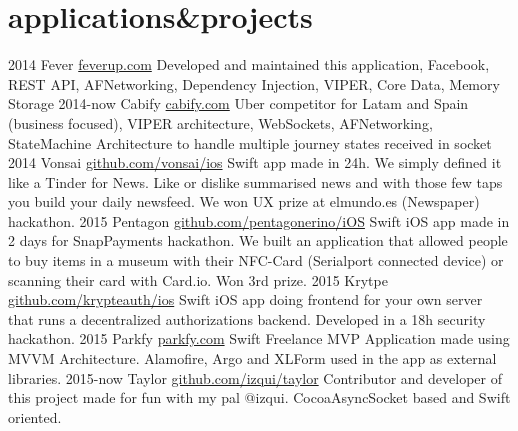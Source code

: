 \documentclass[]{perezpaya-cv}
\begin{document}
\section{applications\&projects}

\begin{entrylist}
  \entry
    {2014}
    {Fever}
    {\href{http://feverup.com}{feverup.com}}
    {Developed and maintained this application, Facebook, REST API, AFNetworking, Dependency Injection, VIPER, Core Data, Memory Storage}
  \entry
    {2014-now}
    {Cabify}
    {\href{http://cabify.com}{cabify.com}}
    {Uber competitor for Latam and Spain (business focused), VIPER architecture, WebSockets, AFNetworking, StateMachine Architecture to handle multiple journey states received in socket }
  \entry
    {2014}
    {Vonsai}
    {\href{https://github.com/vonsai/ios}{github.com/vonsai/ios}}
    {Swift app made in 24h. We simply defined it like a Tinder for News. Like or dislike summarised news and with those few taps you build your daily newsfeed. We won UX prize at elmundo.es (Newspaper) hackathon.}
  \entry
    {2015}
    {Pentagon}
    {\href{https://github.com/pentagonerino/iOS}{github.com/pentagonerino/iOS}}
    {Swift iOS app made in 2 days for SnapPayments hackathon. We built an application that allowed people to buy items in a museum with their NFC-Card (Serialport connected device) or scanning their card with Card.io. Won 3rd prize.}
  \entry
    {2015}
    {Krytpe}
    {\href{https://github.com/krypteauth/ios}{github.com/krypteauth/ios}}
    {Swift iOS app doing frontend for your own server that runs a decentralized authorizations backend. Developed in a 18h security hackathon.}
  \entry
    {2015}
    {Parkfy}
    {\href{https://parkfy.com}{parkfy.com}}
    {Swift Freelance MVP Application made using MVVM Architecture. Alamofire, Argo and XLForm used in the app as external libraries.}
  \entry
    {2015-now}
    {Taylor}
    {\href{http://github.com/izqui/Taylor}{github.com/izqui/taylor}}
    {Contributor and developer of this project made for fun with my pal @izqui. CocoaAsyncSocket based and Swift oriented.}
\end{entrylist}
\end{document}
